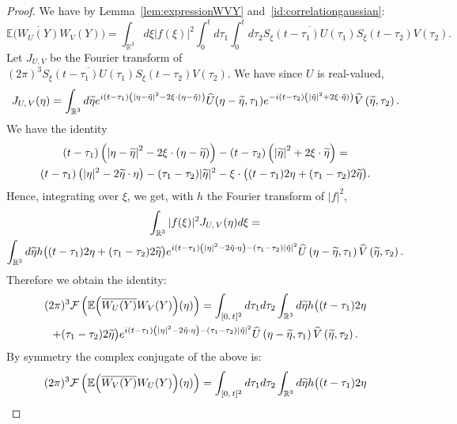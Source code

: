 \documentclass[AHL, Unicode, longabstracts,published]{cedram}
\newcommand{\R}{\mathbb{R}}
\newcommand{\E}{\mathbb{E}}
\newcommand{\mclF}{\mathcal{F}}
\let\oldtilde\tilde
\renewcommand*{\tilde}[1]{\mathchoice{\widetilde{#1}}{\widetilde{#1}}{\oldtilde{#1}}{\oldtilde{#1}}}
\let\oldhat\hat
\renewcommand*{\hat}[1]{\mathchoice{\widehat{#1}}{\widehat{#1}}{\oldhat{#1}}{\oldhat{#1}}}
\begin{document}
\begin{proof}
We have by Lemma~\ref{lem:expressionWVY} and~\eqref{id:correlationgaussian}:
\[
\E\Big(\overline{W_U(Y)} W_V(Y)\Big) = \int_{\R^3} d\xi |f(\xi)|^2 \int_0^t d\tau_1 \int_0^{t} d\tau_2 \overline{S_\xi(t-\tau_1) U(\tau_1)} S_\xi (t-\tau_2) V(\tau_2).
\]
Let $J_{U,V}$ be the Fourier transform of $(2\pi)^3\overline{S_\xi(t-\tau_1) U(\tau_1)} S_\xi (t-\tau_2) V(\tau_2)$. We have since $U$ is real-valued,
\[
J_{U,\,V}(\eta)= \int_{\R^3} d\tilde{\eta} e^{i(t-\tau_1)\left(\left|\eta-\tilde{\eta}\right|^2-2\xi \cdot \left(\eta-\tilde{\eta}\right)\right)}\hat U(\eta-\tilde{\eta},\tau_1)e^{-i(t-\tau_2)\left(\left|\tilde{\eta}\right|^2 +2\xi \cdot \tilde{\eta})\right) } \hat V\left(\tilde{\eta},\tau_2\right).
\]
We have the identity
\begin{multline*}
(t-\tau_1)\left(\left|\eta-\tilde{\eta}\right|^2-2\xi \cdot \left(\eta-\tilde{\eta}\right)\right) -(t-\tau_2)\left(\left|\tilde{\eta}\right|^2 +2\xi \cdot \tilde{\eta}\right) = \\
(t-\tau_1)\left(|\eta|^2-2\tilde{\eta}\cdot \eta\right) -(\tau_1-\tau_2)|\tilde{\eta}|^2-\xi\cdot \big((t-\tau_1)2\eta+(\tau_1-\tau_2)2\tilde \eta\big).
\end{multline*}
Hence, integrating over $\xi$, we get, with $h$ the Fourier transform of $|f|^2$,
\begin{multline*}
\int_{\R^3} |f(\xi)|^2 J_{U,\,V}(\eta) d\xi =\\
\int_{\R^3} d\tilde{\eta} h\big((t-\tau_1)2\eta + (\tau_1-\tau_2) 2\tilde{\eta}\big) e^{i(t-\tau_1)\left(|\eta|^2-2\tilde{\eta}\cdot \eta\right)-(\tau_1-\tau_2)|\tilde{\eta}|^2}\hat U\left(\eta-\tilde{\eta},\tau_1\right) \hat V\left(\tilde{\eta},\tau_2\right).
\end{multline*}
Therefore we obtain the identity:
\begin{multline}\label{id:J1part1}
(2\pi)^{3} \mclF \left(\E\Big(\overline{W_U(Y)} W_V(Y)\Big)(\eta)\right)
 = \int_{[0,\,t]^2} d\tau_1d\tau_2\int_{\R^3} d\tilde{\eta} h\big((t-\tau_1)2\eta\\
+ (\tau_1-\tau_2) 2\tilde{\eta}\big) e^{i(t-\tau_1)\left(|\eta|^2-2\tilde{\eta}\cdot \eta\right)-(\tau_1-\tau_2)|\tilde{\eta}|^2 }\hat U\left(\eta-\tilde{\eta},\tau_1\right) \hat V\left(\tilde{\eta},\tau_2\right).
\end{multline}
By symmetry the complex conjugate of the above is:
\begin{multline*}
(2\pi)^{3}\mclF \left(\E\Big(\overline{W_V(Y)} W_U(Y)\Big)(\eta)\right)
= \int_{[0,\,t]^2} d\tau_1d\tau_2\int_{\R^3} d\tilde{\eta} h\big((t-\tau_1)2\eta \\

\end{multline*}
\end{proof}
\end{document}
